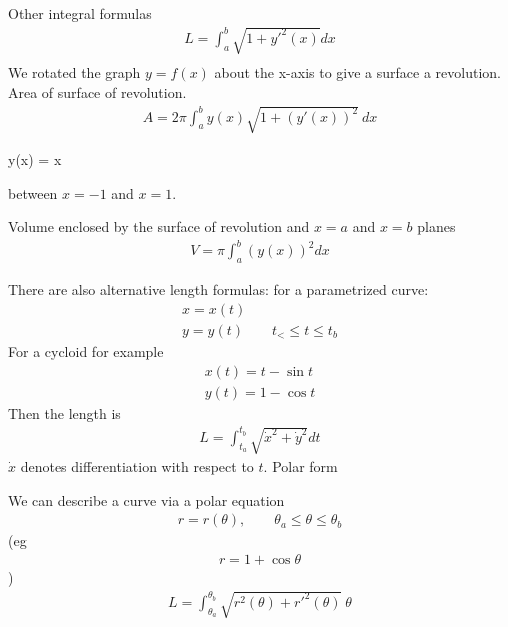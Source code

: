 Other integral formulas 
\begin{align*}
L = \int_a^b \sqrt{1+y'^2(x)} dx \\
\end{align*}
We rotated the graph $y=f(x)$ about the x-axis to give a surface a revolution. Area of surface of revolution.
\begin{align*}
A = 2\pi\int_a^b y(x) \sqrt{1+(y'(x))^2} ~dx
\end{align*}

\begin{nex}
	\item
	\begin{itemal}
		y(x) = \cosh x
	\end{itemal}
	between $x=-1$ and $x=1$.
\end{nex}

Volume enclosed by the surface of revolution and $x=a$ and $x=b$ planes
\begin{align*}
V = \pi \int_a^b (y(x))^2 dx
\end{align*}


There are also alternative length formulas:
for a parametrized curve:
\begin{align*}
x=x(t) \\
y=y(t) \qquad t_< \le t \le t_b 
\end{align*}
For a cycloid for example
\begin{align*}
x(t) = t -\sin t \\
y(t) = 1- \cos t
\end{align*}
Then the length is
\begin{align*}
L = \int_{t_a}^{t_b} \sqrt{\dot x^2 + \dot y^2} dt
\end{align*}
$\dot x$ denotes differentiation with respect to $t$.
Polar form

We can describe a curve via a polar equation 
\begin{align*}
r = r(\theta), \qquad \theta_a \le \theta \le \theta_b
\end{align*}
(eg
\begin{align*}
r = 1 + \cos \theta
\end{align*}
)
\begin{align*}
L = \int_{\theta_a}^{\theta_b} \sqrt{r^2(\theta) + r'^2(\theta)}~ \theta
\end{align*}

